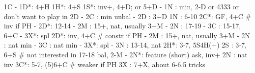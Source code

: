 1C - 
1D*: 4+H
1H*: 4+S
1S*: inv+, 4+D; or 5+D
   - 1N : min, 2-D or 4333 or don't want to play in 2D
   - 2C : min unbal
   - 2D : 3+D
1N : 6-10
2C*: GF, 4+C  # inv if PH
   - 2D*: 12-14
   - 2M : 15+, nat, usually 3+M
   - 2N : 17-19
   - 3C : 15-17, 6+C
   - 3X*: spl
2D*: inv, 4+C  # constr if PH
   - 2M : 15+, nat, usually 3+M
   - 2N : nat min
   - 3C : nat min
   - 3X*: spl
   - 3N : 13-14, nat
2H*: 3-7, 5S4H(+)
2S : 3-7, 6+S  # not interested in 17-18 bal, 2-M
   - 2N*: feature (short) ask, inv+
2N : nat inv
3C*: 5-7, (5)6+C  # weaker if PH
3X : 7+X, about 6-6.5 tricks
